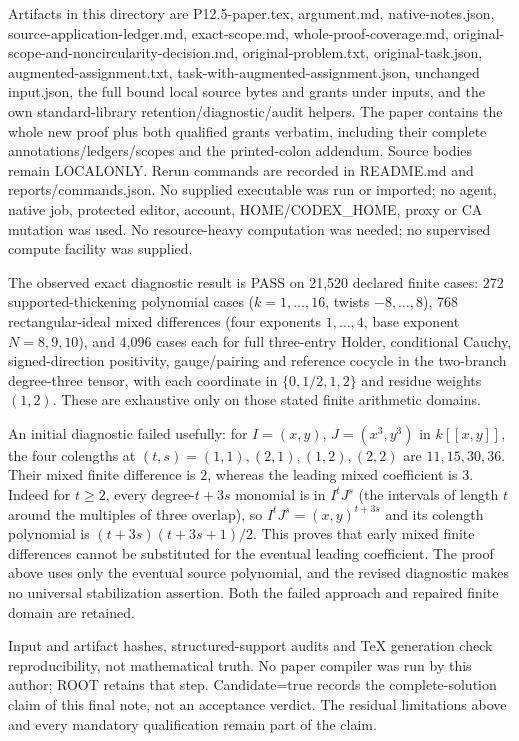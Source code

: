 \documentclass[
  11pt,
]{article}
\begin{document}
Artifacts in this directory are P12.5-paper.tex, argument.md,
native-notes.json, source-application-ledger.md, exact-scope.md,
whole-proof-coverage.md, original-scope-and-noncircularity-decision.md,
original-problem.txt, original-task.json, augmented-assignment.txt,
task-with-augmented-assignment.json, unchanged input.json, the full
bound local source bytes and grants under inputs, and the own
standard-library retention/diagnostic/audit helpers. The paper contains
the whole new proof plus both qualified grants verbatim, including their
complete annotations/ledgers/scopes and the printed-colon addendum.
Source bodies remain LOCALONLY. Rerun commands are recorded in README.md
and reports/commands.json. No supplied executable was run or imported;
no agent, native job, protected editor, account, HOME/CODEX\_HOME, proxy
or CA mutation was used. No resource-heavy computation was needed; no
supervised compute facility was supplied.

The observed exact diagnostic result is PASS on 21,520 declared finite
cases: 272 supported-thickening polynomial cases (\(k=1,\ldots,16\),
twists \(-8,\ldots,8\)), 768 rectangular-ideal mixed differences (four
exponents \(1,\ldots,4\), base exponent \(N=8,9,10\)), and 4,096 cases
each for full three-entry Holder, conditional Cauchy, signed-direction
positivity, gauge/pairing and reference cocycle in the two-branch
degree-three tensor, with each coordinate in \(\{0,1/2,1,2\}\) and
residue weights \((1,2)\). These are exhaustive only on those stated
finite arithmetic domains.

An initial diagnostic failed usefully: for \(I=(x,y)\), \(J=(x^3,y^3)\)
in \(k[[x,y]]\), the four colengths at \((t,s)=(1,1),(2,1),(1,2),(2,2)\)
are \(11,15,30,36\). Their mixed finite difference is \(2\), whereas the
leading mixed coefficient is \(3\). Indeed for \(t\ge2\), every
degree-\(t+3s\) monomial is in \(I^tJ^s\) (the intervals of length \(t\)
around the multiples of three overlap), so \(I^tJ^s=(x,y)^{t+3s}\) and
its colength polynomial is \((t+3s)(t+3s+1)/2\). This proves that early
mixed finite differences cannot be substituted for the eventual leading
coefficient. The proof above uses only the eventual source polynomial,
and the revised diagnostic makes no universal stabilization assertion.
Both the failed approach and repaired finite domain are retained.

Input and artifact hashes, structured-support audits and TeX generation
check reproducibility, not mathematical truth. No paper compiler was run
by this author; ROOT retains that step. Candidate=true records the
complete-solution claim of this final note, not an acceptance verdict.
The residual limitations above and every mandatory qualification remain
part of the claim.
\end{document}
